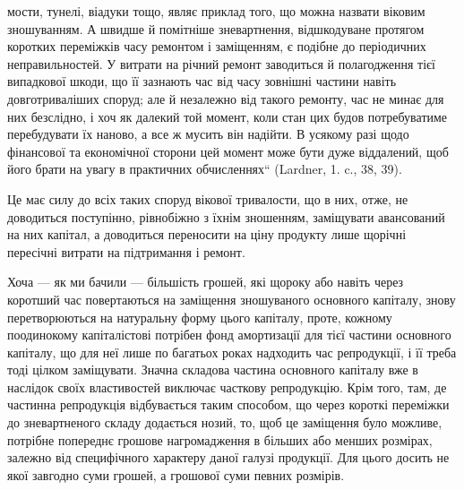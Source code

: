 \parcont{}  %
мости, тунелі, віадуки тощо, являє приклад того, що можна назвати
віковим зношуванням. А швидше й помітніше зневартнення, відшкодуване
протягом коротких переміжків часу ремонтом і заміщенням, є подібне
до періодичних неправильностей. У витрати на річний ремонт заводиться
й полагодження тієї випадкової шкоди, що її зазнають час від часу
зовнішні частини навіть довготриваліших споруд; але й незалежно від
такого ремонту, час не минає для них безслідно, і хоч як далекий той момент,
коли стан цих будов потребуватиме перебудувати їх наново, а все ж
мусить він надійти. В усякому разі щодо фінансової та економічної сторони
цей момент може бути дуже віддалений, щоб його брати на увагу
в практичних обчисленнях“ (Lardner, 1. c., 38, 39).

Це має силу до всіх таких споруд вікової тривалости, що в них,
отже, не доводиться поступінно, рівнобіжно з їхнім зношенням, заміщувати
авансований на них капітал, а доводиться переносити на ціну продукту
лише щорічні пересічні витрати на підтримання і ремонт.

Хоча — як ми бачили — більшість грошей, які щороку або навіть
через коротший час повертаються на заміщення зношуваного основного
капіталу, знову перетворюються на натуральну форму цього капіталу,
проте, кожному поодинокому капіталістові потрібен фонд амортизації для тієї
частини основного капіталу, що для неї лише по багатьох роках надходить час
репродукції, і її треба тоді цілком заміщувати. Значна складова частина основного
капіталу вже в наслідок своїх властивостей виключає часткову репродукцію.
Крім того, там, де частинна репродукція відбувається таким способом, що
через короткі переміжки до зневартненого складу додається нозий, то, щоб це
заміщення було можливе, потрібне попереднє грошове нагромадження
в більших або менших розмірах, залежно від специфічного характеру
даної галузі продукції. Для цього досить не якої завгодно суми грошей,
а грошової суми певних розмірів.

